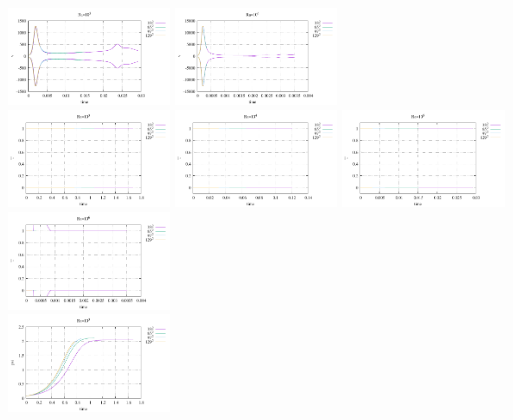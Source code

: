 \begin{center}
\includegraphics[width=4.297cm]{python_codes/fieldstone_155/results/stats_v_Ra1e5}
\includegraphics[width=4.297cm]{python_codes/fieldstone_155/results/stats_v_Ra1e6}\\
\includegraphics[width=4.297cm]{python_codes/fieldstone_155/results/stats_T_Ra1e3}
\includegraphics[width=4.297cm]{python_codes/fieldstone_155/results/stats_T_Ra1e4}
\includegraphics[width=4.297cm]{python_codes/fieldstone_155/results/stats_T_Ra1e5}
\includegraphics[width=4.297cm]{python_codes/fieldstone_155/results/stats_T_Ra1e6}\\
\includegraphics[width=4.297cm]{python_codes/fieldstone_155/results/stats_psi_Ra1e3}

\end{center}
